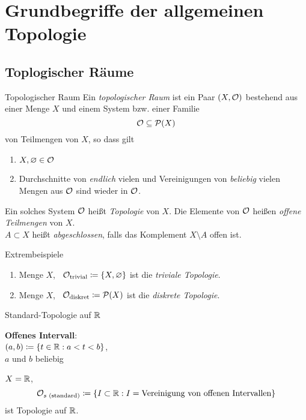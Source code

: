 \chapter{Grundbegriffe der allgemeinen Topologie}

\section{Toplogischer Räume}

\begin{definition}{Topologischer Raum}
  Ein \emph{topologischer Raum} ist ein Paar $ (X, \mathcal{O}) $ bestehend aus einer Menge $ X $ und einem System bzw. einer Familie 
  \begin{equation*}
    \mathcal{O} \subseteq \mathcal{P}(X)
  \end{equation*}
  von Teilmengen von $ X $, so dass gilt
  \begin{enumerate}
    \item $ X, \varnothing \in \mathcal{O} $ 
    \item Durchschnitte von \emph{endlich} vielen und Vereinigungen von \emph{beliebig} vielen Mengen aus $ \mathcal{O} $ sind wieder in $ \mathcal{O} $.
  \end{enumerate}
  Ein solches System $ \mathcal{O} $ heißt \emph{Topologie} von $ X $. Die Elemente von $ \mathcal{O} $ heißen \emph{offene Teilmengen} von $ X $. \\
  $ A \subset X $ heißt \emph{abgeschlossen}, falls das Komplement $ X \setminus A $ offen ist.
\end{definition}

\begin{example}{Extrembeispiele}
  \begin{enumerate}
    \item Menge $ X $, \ $ \mathcal{O}_\text{trivial} \coloneqq \{ X, \varnothing \} $ ist die \emph{triviale Topologie}.
    \item Menge $ X $, \ $ \mathcal{O}_\text{diskret} \coloneqq \mathcal{P}(X) $ ist die \emph{diskrete Topologie}.
  \end{enumerate}
\end{example}

\begin{example}{Standard-Topologie auf $ \mathbb{R} $}
  \begin{marginfigure}[4em]
    \textbf{Offenes Intervall}: \\ $ (a,b) \coloneqq \{  t \in \mathbb{R} : a < t < b \} $, \\ $ a $ und $ b $ beliebig
  \end{marginfigure}
  $ X = \mathbb{R} $,
  \begin{equation*}
    \mathcal{O}_{s \text{ (standard)}} \coloneqq \{ I \subset \mathbb{R} : I = \text{Vereinigung von offenen Intervallen} \}
  \end{equation*}
  ist Topologie auf $ \mathbb{R} $.
\end{example}

